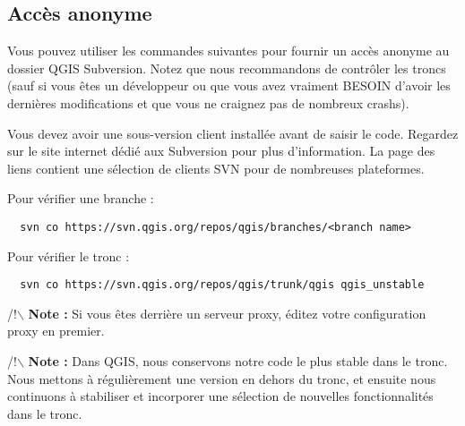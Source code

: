 \subsection{Acc\`es anonyme}

Vous pouvez utiliser les commandes suivantes pour fournir un acc\`es anonyme au dossier QGIS Subversion. Notez que nous recommandons de contr\^oler les troncs (sauf si vous \^etes un d\'eveloppeur ou que vous avez vraiment BESOIN d'avoir les derni\`eres modifications et que vous ne craignez pas de nombreux crashs).

Vous devez avoir une sous-version client install\'ee avant de saisir le code. Regardez sur le site internet d\'edi\'e aux Subversion pour plus d'information. La page des liens contient une s\'election de clients SVN pour de nombreuses plateformes.

Pour v\'erifier une branche :

\begin{verbatim}
  svn co https://svn.qgis.org/repos/qgis/branches/<branch name>
\end{verbatim}

Pour v\'erifier le tronc :

\begin{verbatim}
  svn co https://svn.qgis.org/repos/qgis/trunk/qgis qgis_unstable
\end{verbatim}

/!$\backslash$ \textbf{Note :} Si vous \^etes derri\`ere un serveur proxy, \'editez votre configuration proxy en premier.

/!$\backslash$ \textbf{Note :} Dans QGIS, nous conservons notre code le plus stable dans le tronc. Nous mettons \`a r\'eguli\`erement une version en dehors du tronc, et ensuite nous continuons \`a stabiliser et incorporer une s\'election de nouvelles fonctionnalit\'es  dans le tronc.

